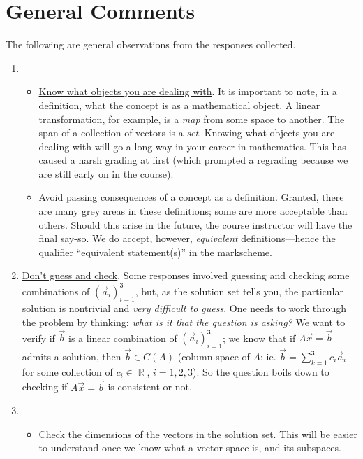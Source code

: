 \documentclass[answers,11pt]{exam}
\theoremstyle{definition}
\theoremstyle{definition}
\DeclareMathOperator{\R}{\mathbb{R}}
\DeclareMathOperator{\1}{\mathbbm{1}}
\begin{document}
\clearpage


\section*{General Comments}
The following are general observations from the responses collected.


\begin{enumerate}
	\item \begin{itemize}
		
		\item \uline{Know what objects you are dealing with}. It is important to note, in a definition, what the concept is as a mathematical object. A linear transformation, for example, is a \textit{map} from some space to another. The span of a collection of vectors is a \textit{set}. Knowing what objects you are dealing with will go a long way in your career in mathematics. This has caused a harsh grading at first (which prompted a regrading because we are still early on in the course).
		
		\item \uline{Avoid passing consequences of a concept as a definition}. Granted, there are many grey areas in these definitions; some are more acceptable than others. Should this arise in the future, the course instructor will have the final say-so. We do accept, however, \textit{equivalent} definitions---hence the qualifier ``equivalent statement(s)'' in the markscheme.
	\end{itemize}
	
	
	\item \uline{Don't guess and check}. Some responses involved guessing and checking some combinations of $(\vec{a}_i)_{i=1}^{3}$, but, as the solution set tells you, the particular solution is nontrivial and \textit{very difficult to guess}. One needs to work through the problem by thinking: \textit{what is it that the question is asking?} We want to verify if $\vec{b}$ is a linear combination of $(\vec{a}_i)_{i=1}^{3}$; we know that if $A\vec{x} = \vec{b}$ admits a solution, then $\vec{b} \in C(A)$ (column space of $A$; ie. $\vec{b} = \sum_{k=1}^{3} c_i \vec{a}_i$ for some collection of $c_i \in \R$, $i=1,2,3$). So the question boils down to checking if $A\vec{x} = \vec{b}$ is consistent or not.
	
	
	\item \begin{itemize}
		\item \uline{Check the dimensions of the vectors in the solution set}. This will be easier to understand once we know what a vector space is, and its subspaces.
		

\end{itemize}
\end{enumerate}
\end{document}
